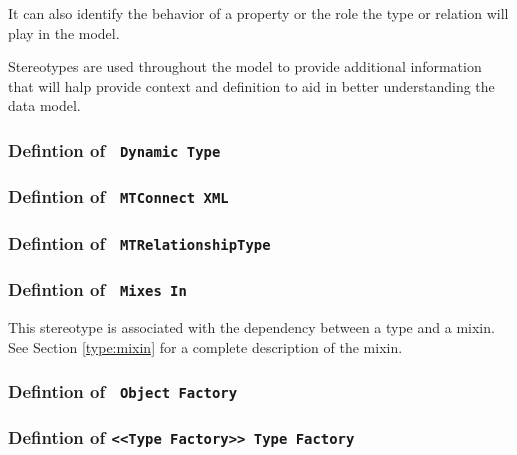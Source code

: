 It can also identify the behavior of a property or the role the type or relation
will play in the model. 

Stereotypes are used throughout the model to provide additional information that 
will halp provide context and definition to aid in better understanding the
data model.

\subsubsection{Defintion of \texttt{ Dynamic Type}} \label{type:Dynamic Type}

\FloatBarrier



\FloatBarrier
\subsubsection{Defintion of \texttt{ MTConnect XML}} \label{type:MTConnect XML}

\FloatBarrier



\FloatBarrier
\subsubsection{Defintion of \texttt{ MTRelationshipType}} \label{type:MTRelationshipType}

\FloatBarrier



\FloatBarrier
\subsubsection{Defintion of \texttt{ Mixes  In}} \label{type:Mixes  In}

\FloatBarrier

This stereotype is associated with the dependency between a type and a mixin. See Section \ref{type:mixin} for a complete 
description of the mixin.

\FloatBarrier
\subsubsection{Defintion of \texttt{ Object Factory}} \label{type:Object Factory}

\FloatBarrier



\FloatBarrier
\subsubsection{Defintion of \texttt{<<Type Factory>> Type Factory}} \label{type:Type Factory}

